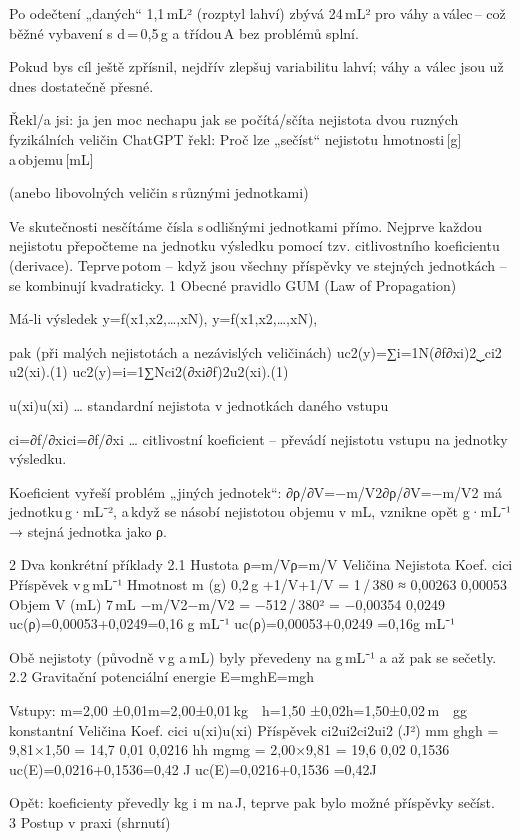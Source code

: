 {    Po odečtení „daných“ 1,1 mL² (rozptyl lahví) zbývá 24 mL² pro váhy a válec – což běžné vybavení s d = 0,5 g a třídou A bez problémů splní.

    Pokud bys cíl ještě zpřísnil, nejdřív zlepšuj variabilitu lahví; váhy a válec jsou už dnes dostatečně přesné.

Řekl/a jsi:
ja jen moc nechapu jak se počítá/sčíta nejistota dvou ruzných fyzikálních veličin
ChatGPT řekl:
​Proč lze „sečíst“ nejistotu hmotnosti [g] a objemu [mL]

(anebo libovolných veličin s různými jednotkami)

Ve skutečnosti nesčítáme čísla s odlišnými jednotkami přímo.
Nejprve každou nejistotu přepočteme na jednotku výsledku pomocí tzv. citlivostního koeficientu (derivace).
Teprve potom – když jsou všechny příspěvky ve stejných jednotkách – se kombinují kvadraticky.
1  Obecné pravidlo GUM (Law of Propagation)

Má‑li výsledek
y=f(x1,x2,…,xN),
y=f(x1​,x2​,…,xN​),

pak (při malých nejistotách a ne­závislých veličinách)
uc2(y)=∑i=1N(∂f∂xi)2⏟ci2  u2(xi).(1)
uc2​(y)=i=1∑N​ci2​
(∂xi​∂f​)2​​u2(xi​).(1)

    u(xi)u(xi​) … standardní nejistota v jednotkách daného vstupu

    ci=∂f/∂xici​=∂f/∂xi​ … citlivostní koeficient – převádí
    nejistotu vstupu na jednotky výsledku.

    Koeficient vyřeší problém „jiných jednotek“:
    ∂ρ/∂V=−m/V2∂ρ/∂V=−m/V2 má jednotku g·mL⁻², a když se násobí nejistotou objemu v mL, vznikne opět g·mL⁻¹ → stejná jednotka jako ρ.

2  Dva konkrétní příklady
2.1  Hustota ρ=m/Vρ=m/V
Veličina	Nejistota	Koef. cici​	Příspěvek v g mL⁻¹
Hmotnost m (g)	0,2 g	+1/V+1/V = 1 / 380 ≈ 0,00263	0,00053
Objem V (mL)	7 mL	−m/V2−m/V2 = −512 / 380² = −0,00354	0,0249
uc(ρ)=0,00053+0,0249=0,16  g mL⁻¹
uc​(ρ)=0,00053+0,0249
​=0,16g mL⁻¹

Obě nejistoty (původně v g a mL) byly převedeny na g mL⁻¹ a až pak se sečetly.
2.2  Gravitační potenciální energie E=mghE=mgh

Vstupy:
m=2,00  ±0,01m=2,00±0,01 kg h=1,50  ±0,02h=1,50±0,02 m gg konstantní
Veličina	Koef. cici​	u(xi)u(xi​)	Příspěvek ci2ui2ci2​ui2​ (J²)
mm	ghgh = 9,81×1,50 = 14,7	0,01	0,0216
hh	mgmg = 2,00×9,81 = 19,6	0,02	0,1536
uc(E)=0,0216+0,1536=0,42  J
uc​(E)=0,0216+0,1536
​=0,42J

Opět: koeficienty převedly kg i m na J, teprve pak bylo možné příspěvky sečíst.
3  Postup v praxi (shrnutí)

}

